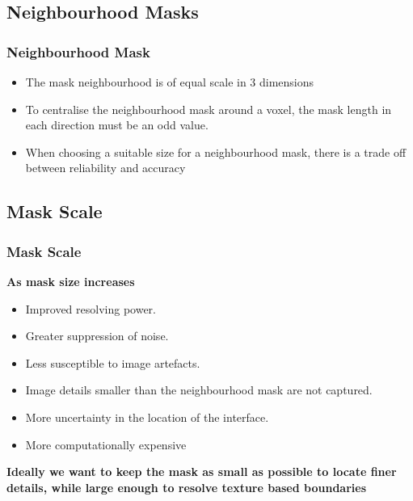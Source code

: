 \documentclass[9pt]{beamer}
\begin{document}
\subsection{Neighbourhood Masks}
\begin{frame}
	\frametitle{Neighbourhood Mask}
		\begin{itemize}
				\item The mask neighbourhood is of equal scale in 3 dimensions
				\item To centralise the neighbourhood mask around a voxel, the mask length in each direction must be an odd value.
				\item When choosing a suitable size for a neighbourhood mask, there is a trade off between reliability and accuracy
		\end{itemize}		
	\end{frame}	
	\subsection{Mask Scale}
\begin{frame}
	\frametitle{Mask Scale}		
		\begin{block}{\textbf{As mask size increases}	}						
				\begin{itemize}
					\item Improved resolving power.
					\item Greater suppression of noise.
					\item Less susceptible to image artefacts.
					\item Image details smaller than the neighbourhood mask are not captured.
					\item More uncertainty in the location of the interface.
					\item More computationally expensive
				\end{itemize}
		\end{block}
						\textbf{Ideally we want to keep the mask as small as possible to locate finer details, while large enough to resolve texture based boundaries}				
\end{frame}
\end{document}
